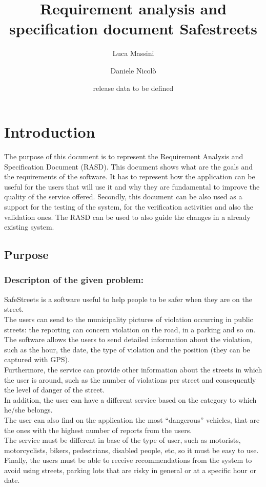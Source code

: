 \documentclass[titlepage]{article}
\author{Luca Massini \and Daniele Nicolò}
\title{Requirement analysis and specification document
Safestreets}
\date{release data to be defined}
\begin{document}
\maketitle
\section{Introduction}
The purpose of this document is to represent the Requirement Analysis and Specification Document (RASD).
This document shows what are the goals and the requirements of the software.
It has to represent how the application can be useful for the users that will use it and why they are fundamental to improve the quality of the service offered. Secondly, this document can be also used as a support for the testing of the system, for the verification activities and also the validation ones. The RASD can be used to also guide the changes in a already existing system.
\subsection{Purpose}

\subsubsection{Descripton of the given problem:}

SafeStreets is a software useful to help people to be safer when they are on the street.\\
The users can send to the municipality pictures of violation occurring in public streets: the reporting can concern violation on the road, in a parking and so on.\\
The software allows the users to send detailed information about the violation, such as the hour, the date, the type of violation and the position (they can be captured with GPS).\\
Furthermore, the service can provide other information about the streets in which the user is around,
such as the number of violations per street and consequently the level of danger of the street.\\
In addition, the user can have a different service based on the category to which he/she belongs.\\
The user can also find on the application the most “dangerous” vehicles, that are the ones with the highest number of reports from the users.\\
The service must be different in base of the type of user, such as motorists, motorcyclists, bikers, pedestrians, disabled people, etc, so it must be easy to use.\\
Finally, the users must be able to receive recommendations from the system to avoid using streets, parking lots that are risky in general or at a specific hour or date.
\end{document}
